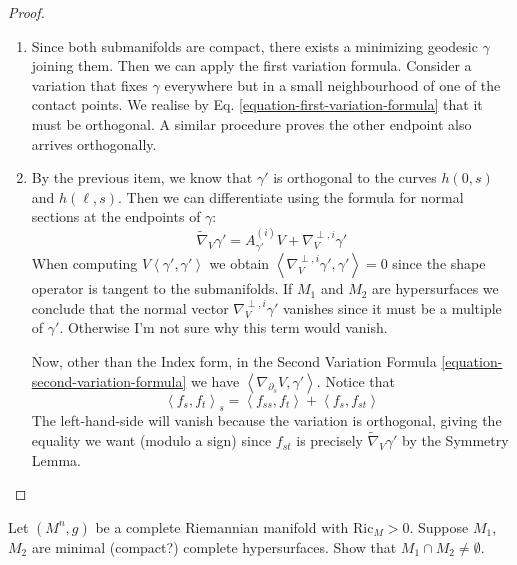 \begin{proof}
\begin{enumerate}
\item Since both submanifolds are compact, there exists a minimizing geodesic
$\gamma$ joining them. Then we can apply the first variation formula. Consider a
variation that fixes $\gamma$ everywhere but in a small neighbourhood of one of
the contact points. We realise by Eq. \ref{equation-first-variation-formula}
that it must be orthogonal. A similar procedure proves the other endpoint also
arrives orthogonally.

\item By the previous item, we
know that $\gamma'$ is orthogonal to the curves $h(0,s)$ and $h(\ell,s)$. Then
we can differentiate using the formula for normal sections at the endpoints of
$\gamma$:
$$
\tilde{\nabla}_{V}\gamma'=A^{(i)}_{\gamma'}V+\nabla^{\perp,i}_V\gamma'
$$
When computing $V\left<\gamma',\gamma'\right>$ we obtain
$\left<\nabla^{\perp,i}_V\gamma',\gamma'\right>=0$ since the shape operator is
tangent to the submanifolds. If $M_1$ and $M_2$ are hypersurfaces we conclude 
that the normal vector $\nabla^{\perp,i}_V\gamma'$ vanishes since it must be a 
multiple of $\gamma'$. Otherwise I'm not sure why this term would vanish.

Now, other than the Index form, in the Second Variation Formula
\ref{equation-second-variation-formula} we have
$\left<\nabla_{\partial_s}V,\gamma'\right>$. Notice that
$$
\left<f_s,f_t\right>_s=\left<f_{ss},f_t\right>+\left<f_s,f_{st}\right>
$$
The left-hand-side will vanish because the variation is orthogonal, giving the
equality we want (modulo a sign) since $f_{st}$ is precisely
$\tilde{\nabla}_V\gamma'$ by the Symmetry Lemma.
\end{enumerate}
\end{proof}

\begin{exercise}
\label{exercise-intersecting-minimal-hypersurfaces}
Let $(M^n,g)$ be a complete Riemannian manifold with $\text{Ric}_M>0$. 
Suppose $M_1$, $M_2$ are minimal (compact?) complete hypersurfaces. Show that 
$M_1 \cap M_2 \neq \emptyset$.
\end{exercise}

